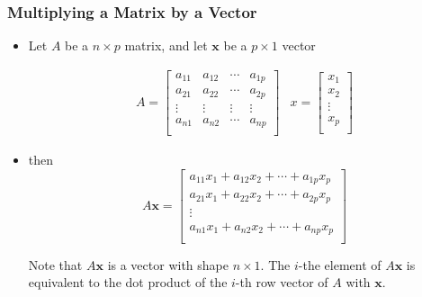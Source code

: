 \documentclass{beamer}
\newcommand{\Mtx}[1]{\ensuremath{\mathbf{#1}}}
\begin{document}

\begin{frame}
  \frametitle{Multiplying a Matrix by a Vector}

\begin{itemize}
	\item Let $A$ be a $n \times p$ matrix, and let \Mtx{x} be a $p \times 1$ vector

\[
\begin{array}{cc}
A = \left[ \begin{array}{cccc}
a_{11} & a_{12} & \cdots & a_{1p} \\
a_{21} & a_{22} & \cdots & a_{2p} \\
\vdots & \vdots & \vdots & \vdots \\
a_{n1} & a_{n2} & \cdots & a_{np} \\

\end{array}
\right]

&	

x = \left[ \begin{array}{c}
x_1 \\ x_2 \\ \vdots \\x_p \\
\end{array}
\right]
\end{array}
\]	

	
\item then
\[
A\Mtx{x} = \left[ \begin{array}{c}
a_{11}x_1 + a_{12}x_2 + \cdots + a_{1p}x_p \\
a_{21}x_1 + a_{22}x_2 + \cdots + a_{2p}x_p \\
\vdots \\
a_{n1}x_1 + a_{n2}x_2 + \cdots + a_{np}x_p \\

\end{array}
\right]
\]

Note that $A\Mtx{x}$ is a vector with shape $n \times 1$. The $i$-the element of $A\Mtx{x}$ is equivalent to the dot product of the $i$-th row vector of $A$ with \Mtx{x}.

\end{itemize}

\end{frame}

\end{document}
